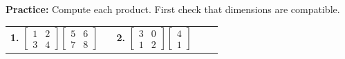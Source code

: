 \documentclass[10pt]{article}
\begin{document}
\begin{practicebox}
  \textbf{Practice:} Compute each product. First check that dimensions are compatible.

  \medskip
  \begin{tabular}{@{}p{0.46\linewidth}p{0.46\linewidth}@{}}
    \textbf{1.}\quad
    $\begin{bmatrix}1 & 2 \\ 3 & 4\end{bmatrix}
     \begin{bmatrix}5 & 6 \\ 7 & 8\end{bmatrix}$

    \smallskip
    \ans{$\begin{bmatrix}1(5)+2(7) & 1(6)+2(8) \\ 3(5)+4(7) & 3(6)+4(8)\end{bmatrix} = \begin{bmatrix}19 & 22 \\ 43 & 50\end{bmatrix}$}
    &
    \textbf{2.}\quad
    $\begin{bmatrix}3 & 0 \\ 1 & 2\end{bmatrix}
     \begin{bmatrix}4 \\ 1\end{bmatrix}$

    \smallskip
    \ans{$\begin{bmatrix}3(4)+0(1) \\ 1(4)+2(1)\end{bmatrix} = \begin{bmatrix}12 \\ 6\end{bmatrix}$}
  \end{tabular}
\end{practicebox}
\end{document}
